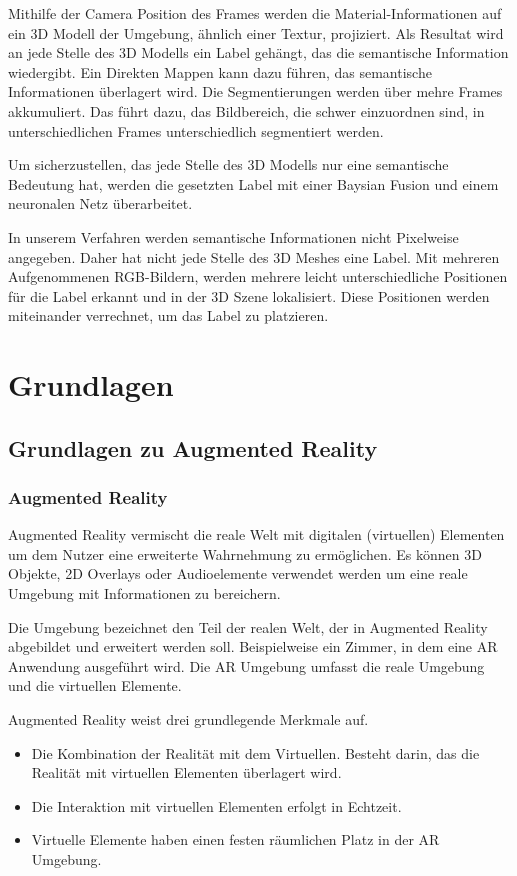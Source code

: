 Mithilfe der Camera Position des Frames werden die Material-Informationen auf ein 3D Modell der Umgebung, ähnlich einer Textur, projiziert. Als Resultat wird an jede Stelle des 3D Modells ein Label gehängt, das die semantische Information wiedergibt.
Ein Direkten Mappen kann dazu führen, das semantische Informationen überlagert wird. Die Segmentierungen werden über mehre Frames akkumuliert. Das führt dazu, das Bildbereich, die schwer einzuordnen sind, in unterschiedlichen Frames unterschiedlich segmentiert werden. 

Um sicherzustellen, das jede Stelle des 3D Modells nur eine semantische Bedeutung hat, werden die gesetzten Label mit einer Baysian Fusion und einem neuronalen Netz überarbeitet.

In unserem Verfahren werden semantische Informationen nicht Pixelweise angegeben. Daher hat nicht jede Stelle des 3D Meshes eine Label. Mit mehreren Aufgenommenen RGB-Bildern, werden mehrere leicht unterschiedliche Positionen für die Label erkannt und in der 3D Szene lokalisiert. Diese Positionen werden miteinander verrechnet, um das Label zu platzieren.  

\newpage
\section{Grundlagen}
\subsection{Grundlagen zu Augmented Reality}
\subsubsection{Augmented Reality} %

Augmented Reality vermischt die reale Welt mit digitalen (virtuellen) Elementen um dem Nutzer eine erweiterte Wahrnehmung zu ermöglichen. Es können 3D Objekte, 2D Overlays oder Audioelemente verwendet werden um eine reale Umgebung mit Informationen zu bereichern. 

Die Umgebung bezeichnet den Teil der realen Welt, der in Augmented Reality abgebildet und erweitert werden soll. Beispielweise ein Zimmer, in dem eine AR Anwendung ausgeführt wird.
Die AR Umgebung umfasst die reale Umgebung und die virtuellen Elemente.

Augmented Reality weist drei grundlegende Merkmale auf. 
\begin{itemize}
	\item Die Kombination der Realität mit dem Virtuellen. Besteht darin, das die Realität mit virtuellen Elementen überlagert wird.
	\item Die Interaktion mit virtuellen Elementen erfolgt in Echtzeit.
	\item Virtuelle Elemente haben einen festen räumlichen Platz in der AR Umgebung.
\end{itemize}

